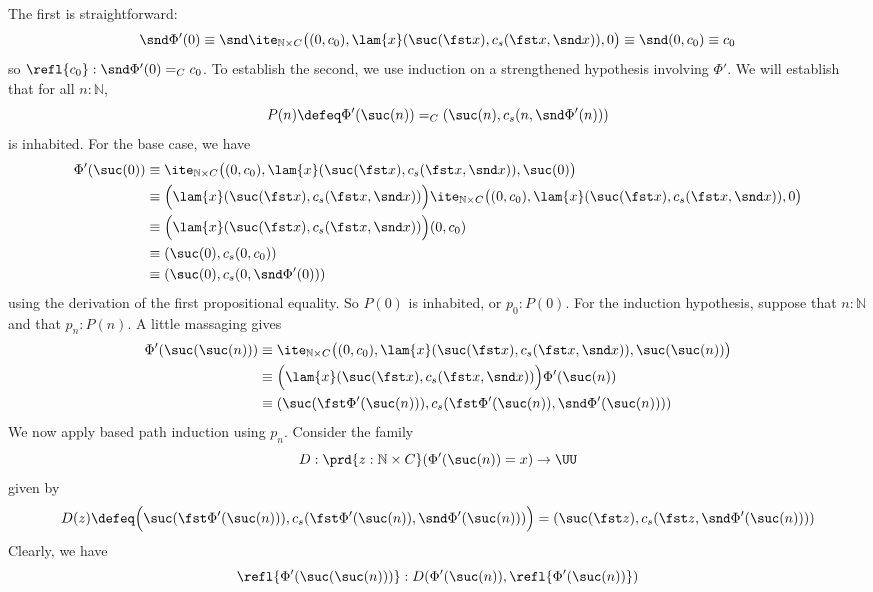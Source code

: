     The first is straightforward:
    \[
    \snd \Phi'(0)
    \equiv
    \snd\ite_{\mathbb{N} \times C}\big(
    (0, c_{0}),
    \lam{x}(\suc(\fst x), c_{s}(\fst x, \snd x)),
    0
    \big)
    \equiv
    \snd(0, c_{0})
    \equiv
    c_{0}
    \]
    so $\refl{c_{0}} : \snd\Phi'(0) =_{C} c_{0}$.  To establish the second, we use
    induction on a strengthened hypothesis involving $\Phi'$.  We will establish
    that for all $n : \mathbb{N}$,
    \[
    P(n) \defeq 
    \Phi'(\suc(n)) =_{C} (\suc(n), c_{s}(n, \snd\Phi'(n)))
    \]
    is inhabited.
    For the base case, we have
    \begin{align*}
    \Phi'(\suc(0)) &\equiv 
    \ite_{\mathbb{N} \times C}\big(
    (0, c_{0}),
    \lam{x}(\suc(\fst x), c_{s}(\fst x, \snd x)),
    \suc(0)
    \big)
    \\&\equiv
    \Big(\lam{x}(\suc(\fst x), c_{s}(\fst x, \snd x))\Big)
    \ite_{\mathbb{N} \times C}\big(
    (0, c_{0}),
    \lam{x}(\suc(\fst x), c_{s}(\fst x, \snd x)),
    0
    \big)
    \\&\equiv
    \Big(\lam{x}(\suc(\fst x), c_{s}(\fst x, \snd x))\Big)
    (0, c_{0})
    \\&\equiv
    (\suc(0), c_{s}(0, c_{0}))
    \\&\equiv
    (\suc(0), c_{s}(0, \snd\Phi'(0)))
    \end{align*}
    using the derivation of the first propositional equality.  So $P(0)$ is
    inhabited, or $p_{0} : P(0)$.  For the induction
    hypothesis, suppose that $n : \mathbb{N}$ and that $p_{n} : P(n)$.  A little
    massaging gives
    \begin{align*}
    \Phi'(\suc(\suc(n)))
    &\equiv
    \ite_{\mathbb{N} \times C}\big(
    (0, c_{0}),
    \lam{x}(\suc(\fst x), c_{s}(\fst x, \snd x)),
    \suc(\suc(n))
    \big)
    \\&\equiv
    \Big(\lam{x}(\suc(\fst x), c_{s}(\fst x, \snd x))\Big) \Phi'(\suc(n))
    \\&\equiv
    (\suc(\fst \Phi'(\suc(n))), c_{s}(\fst \Phi'(\suc(n)), \snd \Phi'(\suc(n)))) 
    \end{align*}
    We now apply based path induction using $p_{n}$.  Consider the family
    \[
    D : \prd{z:\mathbb{N} \times C}(\Phi'(\suc(n)) = x) \to \UU
    \]
    given by
    \[
    D(z) \defeq 
    \Big(\suc(\fst \Phi'(\suc(n))), c_{s}(\fst \Phi'(\suc(n)), \snd
    \Phi'(\suc(n)))\Big) 
    =
    (\suc(\fst z), c_{s}(\fst z, \snd \Phi'(\suc(n)))) 
    \]
    Clearly, we have
    \[
    \refl{\Phi'(\suc(\suc(n)))} : D(\Phi'(\suc(n)), \refl{\Phi'(\suc(n))})
    \]
